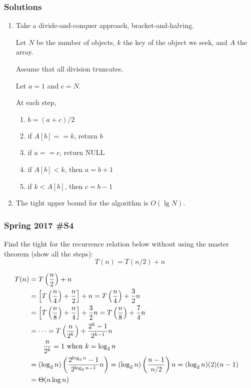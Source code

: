 \subsubsection{Solutions}

\begin{enumerate}[label=\alph*.]
	\item Take a divide-and-conquer approach, bracket-and-halving.
	
	Let 
	$N$ be the number of objects, 
	$k$ the key of the object we seek, and
	$A$ the array.
	
	Assume that all division truncates.

	Let $a=1$ and $c=N$.  
	
	At each step, 
	
	\begin{enumerate}[label=\arabic*.]
		\item $b = (a+c)/2$
		\item if $A[b]==k$, return $b$
		\item if $a==c$, return NULL
		\item if $A[b] < k$, then $a=b+1$
		\item if $k < A[b]$, then $c = b-1$
	\end{enumerate}
	
	\item The tight upper bound for the algorithm is $O(\lg N)$.  
		
\end{enumerate}

\subsubsection{Spring 2017 \#S4}
	Find the tight for the recurrence relation below without using the master theorem (show all the steps):
	$$T(n) = T(n/2) + n$$
	
\begin{align*}
	T(n) &= T\left( \frac{n}{2} \right) + n \cr
	&= \left[ T\left( \frac{n}{4} \right) + \frac{n}{2} \right] + n  = T \left( \frac{n}{4} \right) + \frac{3}{2} n\cr
	&= \left[ T \left( \frac{n}{8} \right) + \frac{n}{4} \right] + \frac{3}{2}n = T \left( \frac{n}{8} \right) + \frac{7}{4}n \cr
	&= \cdots = T \left( \frac{n}{2^k} \right) + \frac{2^k-1}{2^{k-1}} n \cr
	& \qquad \frac{n}{2^k} = 1 \text{ when } k = \log_2 n \cr
	&= (\log_2 n) \left( \frac{2^{\log_2 n} - 1}{2^{\log_2 n - 1}} n \right) 
	= (\log_2 n) \left( \frac{n-1}{n/2} \right) n
	= (\log_2 n) (2)(n-1) \cr
	&= \Theta(n \log n) \cr
\end{align*}

